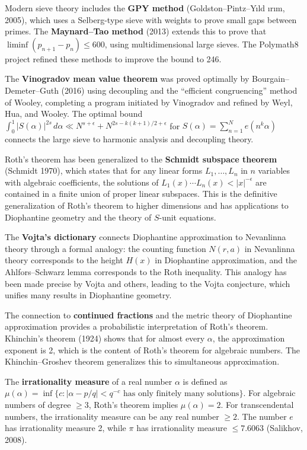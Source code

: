 Modern sieve theory includes the \textbf{GPY method} (Goldston--Pintz--Y{\i}ld
{\i}r{\i}m, 2005), which uses a Selberg-type sieve with weights to prove
small gaps between primes. The \textbf{Maynard--Tao method} (2013) extends
this to prove that $\liminf(p_{n+1} - p_n) \leq 600$, using multidimensional
large sieves. The Polymath8 project refined these methods to improve the bound
to 246.

The \textbf{Vinogradov mean value theorem} was proved optimally by
Bourgain--Demeter--Guth (2016) using decoupling and the ``efficient
congruencing'' method of Wooley, completing a program initiated by Vinogradov
and refined by Weyl, Hua, and Wooley. The optimal bound $\int_0^1 |S(\alpha)|
^{2s} \, d\alpha \ll N^{s+\epsilon} + N^{2s - k(k+1)/2 + \epsilon}$ for
$S(\alpha) = \sum_{n=1}^N e(n^k \alpha)$ connects the large sieve to harmonic
analysis and decoupling theory.

Roth's theorem has been generalized to the \textbf{Schmidt subspace theorem}
(Schmidt 1970), which states that for any linear forms $L_1, \ldots, L_n$ in
$n$ variables with algebraic coefficients, the solutions of $L_1(x) \cdots
L_n(x) < |x|^{-\epsilon}$ are contained in a finite union of proper linear
subspaces. This is the definitive generalization of Roth's theorem to higher
dimensions and has applications to Diophantine geometry and the theory of
$S$-unit equations.

The \textbf{Vojta's dictionary} connects Diophantine approximation to
Nevanlinna theory through a formal analogy: the counting function $N(r, a)$
in Nevanlinna theory corresponds to the height $H(x)$ in Diophantine
approximation, and the Ahlfors--Schwarz lemma corresponds to the Roth
inequality. This analogy has been made precise by Vojta and others, leading to
the Vojta conjecture, which unifies many results in Diophantine geometry.

The connection to \textbf{continued fractions} and the metric theory of
Diophantine approximation provides a probabilistic interpretation of Roth's
theorem. Khinchin's theorem (1924) shows that for almost every $\alpha$, the
approximation exponent is 2, which is the content of Roth's theorem for
algebraic numbers. The Khinchin--Groshev theorem generalizes this to
simultaneous approximation.

The \textbf{irrationality measure} of a real number $\alpha$ is defined as
$\mu(\alpha) = \inf\{c : |\alpha - p/q| < q^{-c} \text{ has only finitely
many solutions}\}$. For algebraic numbers of degree $\geq 3$, Roth's theorem
implies $\mu(\alpha) = 2$. For transcendental numbers, the irrationality
measure can be any real number $\geq 2$. The number $e$ has irrationality
measure 2, while $\pi$ has irrationality measure $\leq 7.6063$ (Salikhov,
2008).

